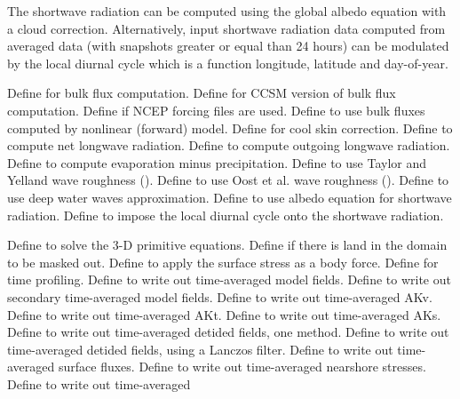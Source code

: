 \begin{klist}
 The shortwave radiation can be computed using the global albedo
 equation with a cloud correction. Alternatively, input shortwave
 radiation data computed from averaged data (with snapshots greater
 or equal than 24 hours) can be modulated by the local diurnal
 cycle which is a function longitude, latitude and day-of-year.
  \begin{klist}
     Define for bulk flux computation.
     Define for CCSM version of bulk flux computation.
     Define if NCEP forcing files are used.
     Define to use bulk fluxes computed by
  nonlinear (forward) model.
     Define for cool skin correction.
     Define to compute net longwave radiation.
     Define to compute outgoing longwave radiation.
     Define to compute evaporation minus precipitation.
     Define to use Taylor and Yelland wave
  roughness (\cite{Taylor_2001}).
     Define to use Oost et al. wave
  roughness (\cite{Oost_2002}).
     Define to use deep water waves approximation.
     Define to use albedo equation for shortwave radiation.
     Define to impose the local diurnal cycle
    onto the shortwave radiation.
  \end{klist}
   \mbox{}
  \begin{klist}
         Define to solve the 3-D primitive
  equations.
       Define if there is land in the domain to be
   masked out.
       Define to apply the surface
  stress as a body force.
         Define for time profiling.
        Define to write out time-averaged
  model fields.
       Define to write out secondary time-averaged
  model fields.
        Define to write out time-averaged AKv.
        Define to write out time-averaged AKt.
        Define to write out time-averaged AKs.
        Define to write out time-averaged
  detided fields, one method.
        Define to write out time-averaged
  detided fields, using a Lanczos filter.
        Define to write out time-averaged
  surface fluxes.
        Define to write out time-averaged
  nearshore stresses.
        Define to write out time-averaged

\end{klist}
\end{klist}
